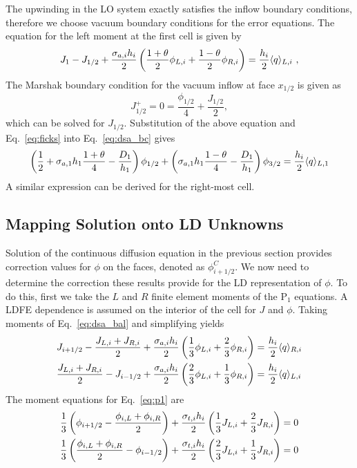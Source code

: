 The upwinding in the LO system exactly satisfies the inflow boundary conditions, therefore we choose
vacuum boundary conditions for the error equations.  The equation for the left moment
at the first cell is given by
\begin{equation}\label{eq:dsa_bc}
    J_{1} - J_{1/2}  + \frac{\sigma_{a,i}h_i}{2} \left(\frac{1+\theta}{2} \phi_{L,i}
    + \frac{1-\theta}{2}
    \phi_{R,i} \right) = \frac{h_i}{2} \langle q \rangle_{L,i}\,\,,
\end{equation}
The Marshak boundary condition for the vacuum inflow at face $x_{1/2}$ is given as
\begin{equation}
    J^+_{1/2} = 0 = \frac{\phi_{1/2}}{4} + \frac{J_{1/2}}{2},
\end{equation}
which can be solved for $J_{1/2}$.  Substitution of the above equation and
Eq.~\eqref{eq:ficks} into Eq.~\eqref{eq:dsa_bc} gives 
\begin{equation}
    \left(\frac{1}{2}+ \sigma_{a,1}h_1\frac{1+\theta}{4} - \frac{D_1}{h_1}\right)\phi_{1/2} +
    \left( {\sigma_{a,1}{h_1}}\frac{1-\theta}{4} - \frac{D_1}{h_1}  \right)\phi_{3/2} =
    \frac{h_i}{2} \langle q \rangle_{L,1}
\end{equation}
A similar expression can be derived for the right-most cell.

\subsection{Mapping Solution onto LD Unknowns}

Solution of the continuous diffusion equation in the previous section provides
correction values for $\phi$ on the faces, denoted as $\phi_{i+1/2}^C$. We now need
to determine the correction these results provide for the LD representation of
$\phi$. To do this, first we take the $L$ and $R$ finite element moments of the P$_1$
equations.  A LDFE dependence is assumed on the interior of the cell for $J$ and
$\phi$.  Taking moments of Eq.~\eqref{eq:dsa_bal} and simplifying yields
\begin{align}
    J_{{i+1/2}} - \frac{J_{L,i} + J_{R,i}}{2} + \frac{\sigma_{a,i} h_i}{2} \left(\frac{1}{3} \phi_{L,i} +
    \frac{2}{3}\phi_{R,i}\right) &= \frac{h_i}{2} \langle q \rangle_{R,i} \\
    \frac{J_{L,i} + J_{R,i}}{2} - J_{i-1/2} + \frac{\sigma_{a,i} h_i}{2}
    \left(\frac{2}{3} \phi_{L,i} +
    \frac{1}{3}\phi_{R,i}\right) &= \frac{h_i}{2} \langle q \rangle_{L,i}
\end{align}
The moment equations for Eq.~\eqref{eq:p1} are
\begin{align}
    \frac{1}{3}\left(\phi_{{i+1/2}} - \frac{\phi_{i,L} + \phi_{i,R}}{2}\right) +
    \frac{\sigma_{t,i} h_i}{2} \left(\frac{1}{3} J_{L,i} + \frac{2}{3}J_{R,i}\right)
    &= 0 \\
    \frac{1}{3}\left(\frac{\phi_{i,L} + \phi_{i,R}}{2} - \phi_{i-1/2} \right) +
    \frac{\sigma_{t,i} h_i}{2} \left(\frac{2}{3} J_{L,i} + \frac{1}{3}J_{R,i}\right)
    &= 0 
\end{align}

